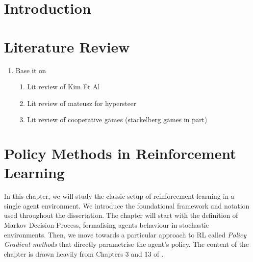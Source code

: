 \documentclass[a4paper,oneside,11pt]{report}
\begin{document}

\dissertationtitlepage


\begin{dissertationsummary}

\end{dissertationsummary}


\dissertationtableofcontents


\chapter{Introduction}

\chapter{Literature Review}

\begin{enumerate}
    \item Base it on 
        \begin{enumerate}
            \item Lit review of Kim Et Al
            \item Lit review of mateusz for hypersteer
            \item Lit review of cooperative games (stackelberg games in part)
        \end{enumerate}
\end{enumerate}

\chapter{Policy Methods in Reinforcement Learning}
\label{ch:policy-methods}

In this chapter, we will study the classic setup of reinforcement learning in a single agent environment. We introduce the foundational framework and notation used throughout the dissertation. The chapter will start with the definition of Markov Decision Process, formalising agents behaviour in stochastic environments. Then, we move towards a particular approach to RL called \textit{Policy Gradient methods} that directly parametrise the agent's policy. The content of the chapter is drawn heavily from Chapters 3 and 13 of \cite{sutton2018rl}. 
\end{document}
